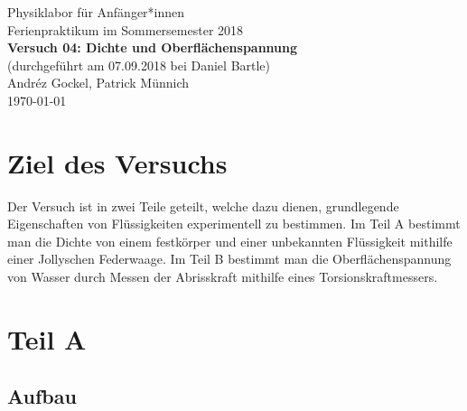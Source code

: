 \documentclass[11pt,a4paper]{article}
\begin{document}
{
\centering 
\large 
Physiklabor für Anf\"anger*innen \\
Ferienpraktikum im Sommersemester 2018 \\[4mm]
\textbf{\LARGE 
Versuch 04: Dichte und Oberflächenspannung
} \\[3mm]
(durchgef\"uhrt am 07.09.2018 bei Daniel Bartle) \\
Andréz Gockel, Patrick M\"unnich\\
\today \\[10mm]
}

\vspace{55pt}
\tableofcontents

\pagebreak

\section{Ziel des Versuchs}
Der Versuch ist in zwei Teile geteilt, welche dazu dienen, grundlegende Eigenschaften von Fl\"ussigkeiten experimentell zu bestimmen. Im Teil A bestimmt man die Dichte von einem festkörper und einer unbekannten Fl\"ussigkeit mithilfe einer Jollyschen Federwaage. Im Teil B bestimmt man die Oberfl\"achen\-spannung von Wasser durch Messen der Abrisskraft mithilfe eines Torsionskraftmessers. 

\section{Teil A}
\subsection{Aufbau}
\end{document}
